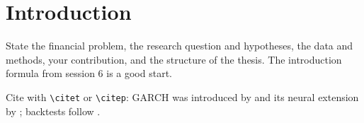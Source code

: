 \chapter{Introduction}

State the financial problem, the research question and hypotheses, the data and methods, your
contribution, and the structure of the thesis. The introduction formula from session 6 is a good start.

Cite with \verb|\citet| or \verb|\citep|: GARCH was introduced by \citet{bollerslev1986} and its neural
extension by \citet{buczynski2024garchnet}; backtests follow \citep{kupiec1995, christoffersen1998}.
